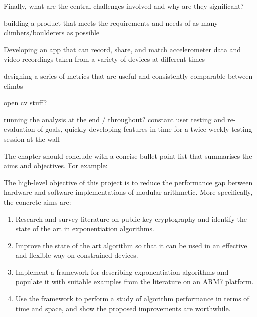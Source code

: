 Finally, what are the central challenges involved and why are they significant?

building a product that meets the requirements and needs of as many climbers/boulderers as possible

Developing an app that can record, share, and match accelerometer data and video recordings taken from a variety of devices at different times

designing a series of metrics that are useful and consistently comparable between climbs

open cv stuff?


running the analysis at the end / throughout?
constant user testing and re-evaluation of goals, quickly developing features in time for a twice-weekly testing session at the wall








The chapter should conclude with a concise bullet point list that
summarises the aims and objectives.  For example:

\noindent
The high-level objective of this project is to reduce the performance
gap between hardware and software implementations of modular arithmetic.
More specifically, the concrete aims are:

\begin{enumerate}
\item Research and survey literature on public-key cryptography and
      identify the state of the art in exponentiation algorithms.
\item Improve the state of the art algorithm so that it can be used
      in an effective and flexible way on constrained devices.
\item Implement a framework for describing exponentiation algorithms
      and populate it with suitable examples from the literature on
      an ARM7 platform.
\item Use the framework to perform a study of algorithm performance
      in terms of time and space, and show the proposed improvements
      are worthwhile.
\end{enumerate}
